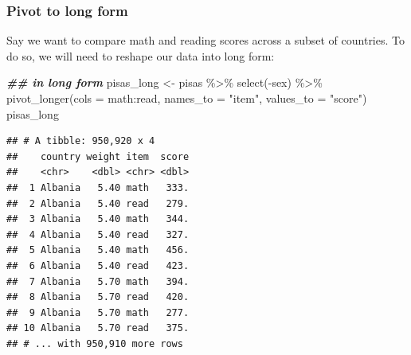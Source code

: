 \documentclass[
]{book}
\newenvironment{Shaded}{\begin{snugshade}}{\end{snugshade}}
\newcommand{\AttributeTok}[1]{\textcolor[rgb]{0.77,0.63,0.00}{#1}}
\newcommand{\DocumentationTok}[1]{\textcolor[rgb]{0.56,0.35,0.01}{\textbf{\textit{#1}}}}
\newcommand{\FunctionTok}[1]{\textcolor[rgb]{0.00,0.00,0.00}{#1}}
\newcommand{\NormalTok}[1]{#1}
\newcommand{\OtherTok}[1]{\textcolor[rgb]{0.56,0.35,0.01}{#1}}
\newcommand{\SpecialCharTok}[1]{\textcolor[rgb]{0.00,0.00,0.00}{#1}}
\newcommand{\StringTok}[1]{\textcolor[rgb]{0.31,0.60,0.02}{#1}}
\begin{document}
\hypertarget{pivot-to-long-form}{%
\subsubsection*{Pivot to long form}\label{pivot-to-long-form}}

Say we want to compare math and reading scores across a subset of countries. To do so, we will need to reshape our data into long form:

\begin{Shaded}
\begin{Highlighting}[]
\DocumentationTok{\#\# in long form}
\NormalTok{pisas\_long }\OtherTok{\textless{}{-}}\NormalTok{ pisas }\SpecialCharTok{\%\textgreater{}\%} 
  \FunctionTok{select}\NormalTok{(}\SpecialCharTok{{-}}\NormalTok{sex) }\SpecialCharTok{\%\textgreater{}\%} 
  \FunctionTok{pivot\_longer}\NormalTok{(}\AttributeTok{cols =}\NormalTok{ math}\SpecialCharTok{:}\NormalTok{read, }\AttributeTok{names\_to =} \StringTok{"item"}\NormalTok{, }\AttributeTok{values\_to =} \StringTok{"score"}\NormalTok{)}
\NormalTok{pisas\_long}
\end{Highlighting}
\end{Shaded}

\begin{verbatim}
## # A tibble: 950,920 x 4
##    country weight item  score
##    <chr>    <dbl> <chr> <dbl>
##  1 Albania   5.40 math   333.
##  2 Albania   5.40 read   279.
##  3 Albania   5.40 math   344.
##  4 Albania   5.40 read   327.
##  5 Albania   5.40 math   456.
##  6 Albania   5.40 read   423.
##  7 Albania   5.70 math   394.
##  8 Albania   5.70 read   420.
##  9 Albania   5.70 math   277.
## 10 Albania   5.70 read   375.
## # ... with 950,910 more rows
\end{verbatim}
\end{document}
